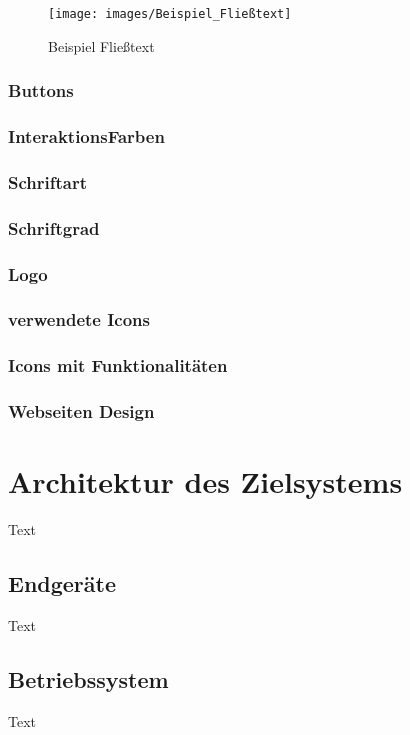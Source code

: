 \begin{figure}[h]
	\centering
	\texttt{[image: images/Beispiel\_Fließtext]}
	\caption{Beispiel Fließtext}
	\label{fig:Beispiel_Fließtext}
\end{figure}

\subsubsection{Buttons}
\subsubsection{InteraktionsFarben}
\subsubsection{Schriftart}
\subsubsection{Schriftgrad}
\subsubsection{Logo}
\subsubsection{verwendete Icons}
\subsubsection{Icons mit Funktionalitäten}
\subsubsection{Webseiten Design}





\section{Architektur des Zielsystems}
Text

\subsection{Endgeräte }
Text

\subsection{Betriebssystem }
Text

